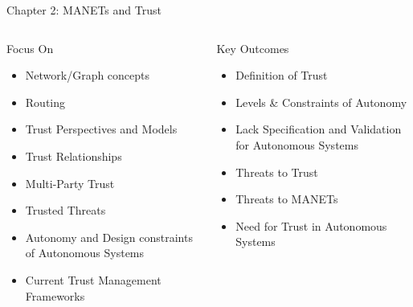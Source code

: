 \documentclass[aspectratio=169]{beamer}
\begin{document}
\begin{frame}{Chapter 2: MANETs and Trust} 
    \begin{columns}
    	\begin{column}{0.5\textwidth}
			\begin{block}{Focus On}
				\begin{itemize}
					\item Network/Graph concepts
					\item Routing
					\item Trust Perspectives and Models
					\item Trust Relationships
					\item Multi-Party Trust
					\item Trusted Threats
					\item Autonomy and Design constraints of Autonomous Systems
					\item Current Trust Management Frameworks
				\end{itemize}
			\end{block}
    	\end{column}
    	\begin{column}{0.5\textwidth}
    		\begin{exampleblock}{Key Outcomes}
    			\begin{itemize}
    				\item Definition of Trust
    				\item Levels \& Constraints of Autonomy
    	            \item Lack Specification and Validation for Autonomous Systems
    				\item Threats to Trust
    				\item Threats to MANETs
    				\item Need for Trust in Autonomous Systems

    			\end{itemize}
    		\end{exampleblock}
    	\end{column}
    \end{columns}
      
\end{frame}
\end{document}
